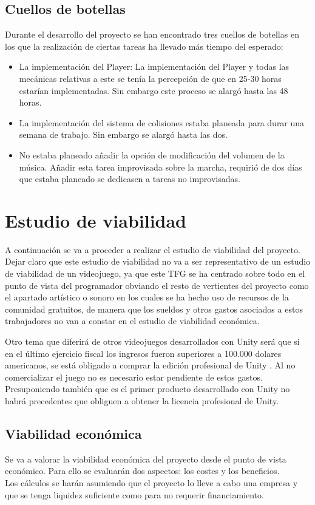\subsection{Cuellos de botellas}
Durante el desarrollo del proyecto se han encontrado tres cuellos de botellas en los que la realización de ciertas tareas ha llevado más tiempo del esperado:
\begin{itemize}
\item
La implementación del Player: La implementación del Player y todas las mecánicas relativas a este se tenía la percepción de que en 25-30 horas estarían implementadas. Sin embargo este proceso se alargó hasta las 48 horas.
\item
La implementación del sistema de colisiones estaba planeada para durar una semana de trabajo. Sin embargo se alargó hasta las dos.
\item
No estaba planeado añadir la opción de modificación del volumen de la música. Añadir esta tarea improvisada sobre la marcha, requirió de dos días que estaba planeado se dedicasen a tareas no improvisadas.
\end{itemize} 

\section{Estudio de viabilidad}
A continuación se va a proceder a realizar el estudio de viabilidad del proyecto. Dejar claro que este estudio de viabilidad no va a ser representativo de un estudio de viabilidad de un videojuego, ya que este TFG se ha centrado sobre todo en el punto de vista del programador obviando el resto de vertientes del proyecto como el apartado artístico o sonoro en los cuales se ha hecho uso de recursos de la comunidad gratuitos, de manera que los sueldos y otros gastos asociados a estos trabajadores no van a constar en el estudio de viabilidad económica.

Otro tema que diferirá de otros videojuegos desarrollados con Unity será que si en el último ejercicio fiscal los ingresos fueron superiores a 100.000 dolares americanos, se está obligado a comprar la edición profesional de Unity \cite{FAQUnity}. Al no comercializar el juego no es necesario estar pendiente de estos gastos. Presuponiendo también que es el primer producto desarrollado con Unity no habrá precedentes que obliguen a obtener la licencia profesional de Unity.

\subsection{Viabilidad económica}
Se va a valorar la viabilidad económica del proyecto desde el punto de vista económico. Para ello se evaluarán dos aspectos: los costes y los beneficios.\\
Los cálculos se harán asumiendo que el proyecto lo lleve a cabo una empresa y que se tenga liquidez suficiente como para no requerir financiamiento.

